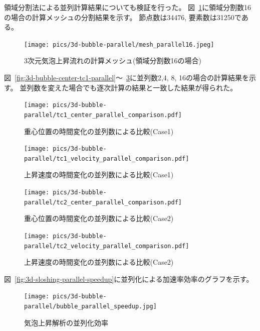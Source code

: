 領域分割法による並列計算結果についても検証を行った。
図~\ref{fig:3d-bubble-mesh-parallel16}に領域分割数16の場合の計算メッシュの分割結果を示す。
節点数は34476, 要素数は31250である。

\begin{figure}[H]
    \centering
    \texttt{[image: pics/3d-bubble-parallel/mesh\_parallel16.jpeg]}
	\caption{3次元気泡上昇流れの計算メッシュ(領域分割数16の場合)}
	\label{fig:3d-bubble-mesh-parallel16}
\end{figure}

図~\ref{fig:3d-bubble-center-tc1-parallel}～~\ref{fig:3d-bubble-velocity-tc2-parallel}に並列数2,4, 8, 16の場合の計算結果を示す。
並列数を変えた場合でも逐次計算の結果と一致した結果が得られた。

\begin{figure}[H]
	\centering
	\begin{minipage}[b]{0.49\columnwidth}
	    \centering
	    \texttt{[image: pics/3d-bubble-parallel/tc1\_center\_parallel\_comparison.pdf]}
		\caption{重心位置の時間変化の並列数による比較(Case1)}
		\label{fig:3d-bubble-center-tc1-parallel}
	\end{minipage}
	\begin{minipage}[b]{0.49\columnwidth}
	    \centering
	    \texttt{[image: pics/3d-bubble-parallel/tc1\_velocity\_parallel\_comparison.pdf]}
		\caption{上昇速度の時間変化の並列数による比較(Case1)}
		\label{fig:3d-bubble-velocity-tc1-parallel}
	\end{minipage}
\end{figure}

\begin{figure}[H]
	\centering
	\begin{minipage}[b]{0.49\columnwidth}
	    \centering
	    \texttt{[image: pics/3d-bubble-parallel/tc2\_center\_parallel\_comparison.pdf]}
		\caption{重心位置の時間変化の並列数による比較(Case2)}
		\label{fig:3d-bubble-center-tc2-parallel}
	\end{minipage}
	\begin{minipage}[b]{0.49\columnwidth}
	    \centering
	    \texttt{[image: pics/3d-bubble-parallel/tc2\_velocity\_parallel\_comparison.pdf]}
		\caption{上昇速度の時間変化の並列数による比較(Case2)}
		\label{fig:3d-bubble-velocity-tc2-parallel}
	\end{minipage}
\end{figure}

図~\ref{fig:3d-sloshing-parallel-speedup}に並列化による加速率効率のグラフを示す。
\begin{figure}[H]
    \centering
	\texttt{[image: pics/3d-bubble-parallel/bubble\_parallel\_speedup.jpg]}
	\caption{気泡上昇解析の並列化効率}
	\label{fig:3d-bubble-parallel-speedup}
\end{figure}